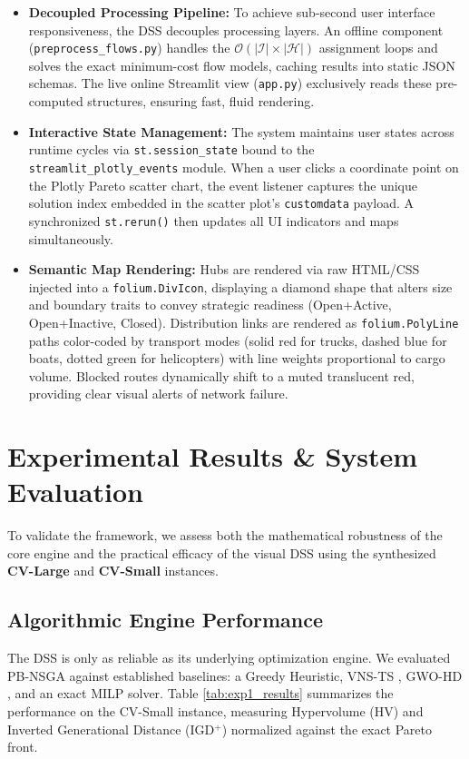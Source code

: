 \documentclass[conference]{IEEEtran}
\begin{document}
\begin{itemize}
    \item \textbf{Decoupled Processing Pipeline:} To achieve sub-second user interface responsiveness, the DSS decouples processing layers. An offline component (\texttt{preprocess\_flows.py}) handles the $\mathcal{O}(|\mathcal{I}| \times |\mathcal{H}|)$ assignment loops and solves the exact minimum-cost flow models, caching results into static JSON schemas. The live online Streamlit view (\texttt{app.py}) exclusively reads these pre-computed structures, ensuring fast, fluid rendering.
    \item \textbf{Interactive State Management:} The system maintains user states across runtime cycles via \texttt{st.session\_state} bound to the \texttt{streamlit\_plotly\_events} module. When a user clicks a coordinate point on the Plotly Pareto scatter chart, the event listener captures the unique solution index embedded in the scatter plot's \texttt{customdata} payload. A synchronized \texttt{st.rerun()} then updates all UI indicators and maps simultaneously.
    \item \textbf{Semantic Map Rendering:} Hubs are rendered via raw HTML/CSS injected into a \texttt{folium.DivIcon}, displaying a diamond shape that alters size and boundary traits to convey strategic readiness (Open+Active, Open+Inactive, Closed). Distribution links are rendered as \texttt{folium.PolyLine} paths color-coded by transport modes (solid red for trucks, dashed blue for boats, dotted green for helicopters) with line weights proportional to cargo volume. Blocked routes dynamically shift to a muted translucent red, providing clear visual alerts of network failure.
\end{itemize}

\section{Experimental Results \& System Evaluation}

To validate the framework, we assess both the mathematical robustness of the core engine and the practical efficacy of the visual DSS using the synthesized \textbf{CV-Large} and \textbf{CV-Small} instances.

\subsection{Algorithmic Engine Performance}
The DSS is only as reliable as its underlying optimization engine. We evaluated PB-NSGA against established baselines: a Greedy Heuristic, VNS-TS \cite{sangsawang2020capacitated}, GWO-HD \cite{Li2023}, and an exact MILP solver. Table \ref{tab:exp1_results} summarizes the performance on the CV-Small instance, measuring Hypervolume (HV) and Inverted Generational Distance (IGD$^+$) normalized against the exact Pareto front. 
\end{document}

